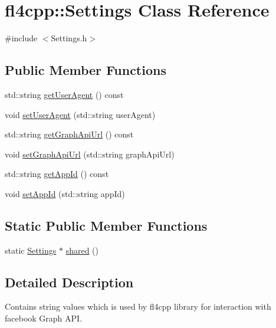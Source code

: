 \hypertarget{classfl4cpp_1_1_settings}{}\section{fl4cpp\+:\+:Settings Class Reference}
\label{classfl4cpp_1_1_settings}


{\ttfamily \#include $<$Settings.\+h$>$}

\subsection*{Public Member Functions}
\begin{DoxyCompactItemize}
\item 
std\+::string \hyperlink{classfl4cpp_1_1_settings_a8963742d36c492133f81eeb47746e7ce}{get\+User\+Agent} () const 
\item 
void \hyperlink{classfl4cpp_1_1_settings_ae242d37ee4727b2c1c5d8f1373d82dba}{set\+User\+Agent} (std\+::string user\+Agent)
\item 
std\+::string \hyperlink{classfl4cpp_1_1_settings_ad78c98110ae7adaad90728fcfdf6a270}{get\+Graph\+Api\+Url} () const 
\item 
void \hyperlink{classfl4cpp_1_1_settings_a5ed2b99d47190be729265a28a039f783}{set\+Graph\+Api\+Url} (std\+::string graph\+Api\+Url)
\item 
std\+::string \hyperlink{classfl4cpp_1_1_settings_aeea7ea9a2b474bfbd206d59ef4860a58}{get\+App\+Id} () const 
\item 
void \hyperlink{classfl4cpp_1_1_settings_ad0cef2a72b32d3243c6d031d6dc81958}{set\+App\+Id} (std\+::string app\+Id)
\end{DoxyCompactItemize}
\subsection*{Static Public Member Functions}
\begin{DoxyCompactItemize}
\item 
static \hyperlink{classfl4cpp_1_1_settings}{Settings} $\ast$ \hyperlink{classfl4cpp_1_1_settings_acb4e714f183c229cac9c65074b69ca48}{shared} ()
\end{DoxyCompactItemize}


\subsection{Detailed Description}
Contains string values which is used by fl4cpp library for interaction with facebook Graph A\+PI.

